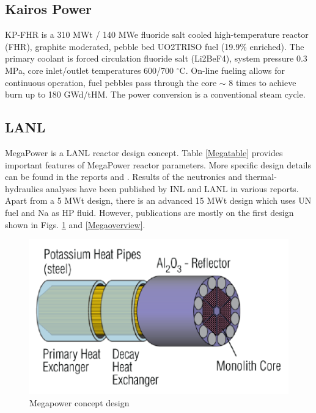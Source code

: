 \subsection{Kairos  Power}
KP-FHR is  a  310  MWt  /  140  MWe  fluoride  salt  cooled  high-temperature  reactor  (FHR),  graphite moderated,  pebble  bed  UO2TRISO  fuel  (19.9\%  enriched). The  primary coolant  is  forced  circulation  fluoride  salt (Li2BeF4), system pressure 0.3 MPa, core inlet/outlet temperatures 600/700 $^\circ{}$C. On-line fueling allows for continuous operation, fuel pebbles pass through the core $\sim$ 8 times to achieve burn up to 180 GWd/tHM. The power conversion is a conventional steam cycle.

\subsection{LANL}
MegaPower is a LANL reactor design concept. Table \ref{Megatable} provides important features of MegaPower reactor parameters. More specific design details can be found in the reports \cite{sterbentz_special_2017} and \cite{mcclure_design_2015}. Results of the neutronics and thermal-hydraulics analyses have been published by \gls{INL} and LANL in various reports. Apart from a 5 MWt design, there is an advanced 15 MWt design which uses UN fuel and Na as HP fluid. However, publications are mostly on the first design shown in Figs. \ref{Megadesign} and \ref{Megaoverview}. 

\begin{figure}[hbtp]
\centering
\includegraphics[scale=0.8]{Figs/megacore.jpeg}
\caption{Megapower concept design}
\label{Megadesign}
\end{figure}

